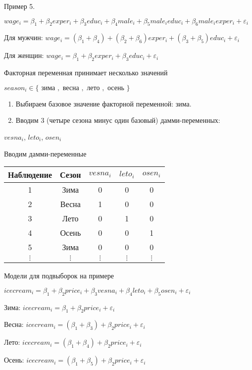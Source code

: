 \documentclass[ignorenonframetext,]{beamer}
\begin{document}
\begin{frame}{Пример 5.}

\(wage_i = \beta_1 + \beta_2 exper_i + \beta_3 educ_i + \beta_4 male_i + \beta_5 male_i educ_i + \beta_6 male_i exper_i + \varepsilon_i\)

Для мужчин:
\(wage_i = (\beta_1+\beta_4) + (\beta_2 + \beta_6) exper_i + (\beta_3 + \beta_5) educ_i + \varepsilon_i\)

Для женщин:
\(wage_i = \beta_1 + \beta_2 exper_i + \beta_3 educ_i + \varepsilon_i\)

\end{frame}

\begin{frame}{Факторная переменная принимает несколько значений}

\(season_i \in \{\text{ зима }, \text{ весна }, \text{ лето }, \text{ осень } \}\)

\begin{enumerate}
\def\labelenumi{\arabic{enumi}.}
\item
  Выбираем базовое значение факторной переменной: зима.
\item
  Вводим 3 (четыре сезона минус один базовый) дамми-переменных:
\end{enumerate}

\(vesna_i\), \(leto_i\), \(osen_i\)

\end{frame}

\begin{frame}{Вводим дамми-переменные}

\begin{tabular}{ccccc}
\hline 
Наблюдение & Сезон & $vesna_i$ & $leto_i$ & $osen_i$  \\ 
\hline 
1 & Зима & 0 & 0 & 0 \\ 
2 & Весна & 1 & 0 & 0 \\ 
3 & Лето & 0 & 1 & 0 \\ 
4 & Осень & 0 & 0 & 1 \\ 
5 & Зима & 0 & 0 & 0 \\ 
$\vdots$ & $\vdots$ & $\vdots$ & $\vdots$ & $\vdots$ \\ 
\hline 
\end{tabular}

\end{frame}

\begin{frame}{Модели для подвыборок на примере}

\(icecream_i=\beta_1 + \beta_2 price_i + \beta_3 vesna_i + \beta_4 leto_i + \beta_5 osen_i + \varepsilon_i\)

Зима: \(icecream_i=\beta_1 + \beta_2 price_i + \varepsilon_i\)

Весна:
\(icecream_i=(\beta_1 + \beta_3) + \beta_2 price_i + \varepsilon_i\)

Лето:
\(icecream_i=(\beta_1 + \beta_4) + \beta_2 price_i + \varepsilon_i\)

Осень:
\(icecream_i=(\beta_1 + \beta_5) + \beta_2 price_i + \varepsilon_i\)

\end{frame}
\end{document}
